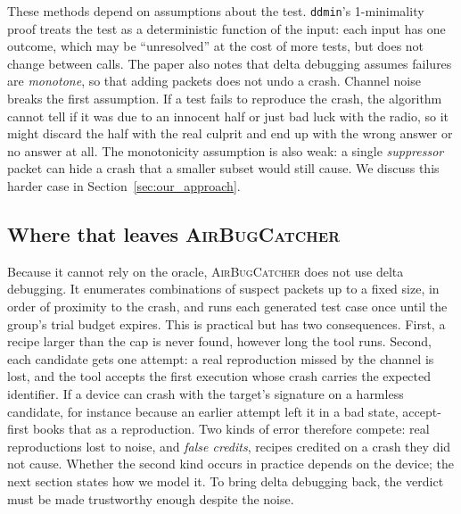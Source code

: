 These methods depend on assumptions about the test. \texttt{ddmin}'s
1-minimality proof treats the test as a deterministic function of the input: each
input has one outcome, which may be ``unresolved'' at the cost of more tests, but
does not change between calls. The paper also notes that delta debugging assumes
failures are \emph{monotone}, so that adding packets does not undo a crash.
Channel noise breaks the first assumption. If a test fails to
reproduce the crash, the algorithm cannot tell if it was due to an innocent half
or just bad luck with the radio, so it might discard the half with the real
culprit and end up with the wrong answer or no answer at all. The monotonicity
assumption is also weak: a single \emph{suppressor} packet can hide a crash that a
smaller subset would still cause. We discuss this harder case in
Section~\ref{sec:our_approach}.

\subsection{Where that leaves \textsc{AirBugCatcher}}

Because it cannot rely on the oracle, \textsc{AirBugCatcher} does not use delta
debugging. It enumerates combinations of suspect packets up to a fixed size, in
order of proximity to the crash, and runs each generated test case once until the
group's trial budget expires. This is practical but has two consequences. First,
a recipe larger than the cap is never found, however long the tool runs. Second,
each candidate gets one attempt: a real reproduction missed by the channel is
lost, and the tool accepts the first execution whose crash carries the expected
identifier. If a device can crash with the target's signature on a harmless
candidate, for instance because an earlier attempt left it in a bad state,
accept-first books that as a reproduction. Two kinds of error therefore compete:
real reproductions lost to noise, and \emph{false credits}, recipes credited on a
crash they did not cause. Whether the second kind occurs in practice depends on
the device; the next section states how we model it. To bring delta debugging
back, the verdict must be made trustworthy enough despite the noise.

